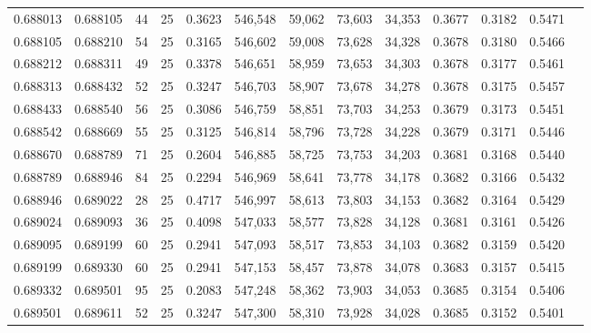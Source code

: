 \begin{tabular}{rrrrrrrrrrrrr}
0.688013 & 0.688105 &    44 &  25 &                                     0.3623 & 546,548 &  59,062 &  73,603 &  34,353 & 0.3677 & 0.3182 & 0.5471 \\
0.688105 & 0.688210 &    54 &  25 &                                     0.3165 & 546,602 &  59,008 &  73,628 &  34,328 & 0.3678 & 0.3180 & 0.5466 \\
0.688212 & 0.688311 &    49 &  25 &                                     0.3378 & 546,651 &  58,959 &  73,653 &  34,303 & 0.3678 & 0.3177 & 0.5461 \\
0.688313 & 0.688432 &    52 &  25 &                                     0.3247 & 546,703 &  58,907 &  73,678 &  34,278 & 0.3678 & 0.3175 & 0.5457 \\
0.688433 & 0.688540 &    56 &  25 &                                     0.3086 & 546,759 &  58,851 &  73,703 &  34,253 & 0.3679 & 0.3173 & 0.5451 \\
0.688542 & 0.688669 &    55 &  25 &                                     0.3125 & 546,814 &  58,796 &  73,728 &  34,228 & 0.3679 & 0.3171 & 0.5446 \\
0.688670 & 0.688789 &    71 &  25 &                                     0.2604 & 546,885 &  58,725 &  73,753 &  34,203 & 0.3681 & 0.3168 & 0.5440 \\
0.688789 & 0.688946 &    84 &  25 &                                     0.2294 & 546,969 &  58,641 &  73,778 &  34,178 & 0.3682 & 0.3166 & 0.5432 \\
0.688946 & 0.689022 &    28 &  25 &                                     0.4717 & 546,997 &  58,613 &  73,803 &  34,153 & 0.3682 & 0.3164 & 0.5429 \\
0.689024 & 0.689093 &    36 &  25 &                                     0.4098 & 547,033 &  58,577 &  73,828 &  34,128 & 0.3681 & 0.3161 & 0.5426 \\
0.689095 & 0.689199 &    60 &  25 &                                     0.2941 & 547,093 &  58,517 &  73,853 &  34,103 & 0.3682 & 0.3159 & 0.5420 \\
0.689199 & 0.689330 &    60 &  25 &                                     0.2941 & 547,153 &  58,457 &  73,878 &  34,078 & 0.3683 & 0.3157 & 0.5415 \\
0.689332 & 0.689501 &    95 &  25 &                                     0.2083 & 547,248 &  58,362 &  73,903 &  34,053 & 0.3685 & 0.3154 & 0.5406 \\
0.689501 & 0.689611 &    52 &  25 &                                     0.3247 & 547,300 &  58,310 &  73,928 &  34,028 & 0.3685 & 0.3152 & 0.5401 \\

\end{tabular}
